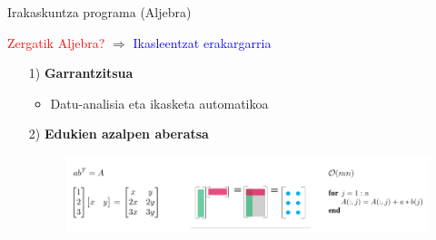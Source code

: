 \documentclass[
 10pt,%
 compress,%
 t,       %
 xcolor=svgnames
]{beamer}
\theoremstyle{definition} \newtheorem{definicion}{Definicion}[section]
\theoremstyle{propiedades} \newtheorem{propiedades}{Propiedades}[section]
\begin{document}
\begin{frame}{Irakaskuntza programa (Aljebra)} 
	
	
	\hspace*{1.cm} \textcolor{red}{Zergatik Aljebra?} \hspace*{1.2cm} $\boldsymbol{\Rightarrow}$ \hspace*{1.2cm} \textcolor{blue}{Ikasleentzat erakargarria}
	
	\bigskip
	\small
	
	\begin{itemize}
		\item[1)] \textbf{Garrantzitsua} %
		\medskip
		\begin{itemize}
			\item Datu-analisia eta ikasketa automatikoa
		\end{itemize}
		
		\bigskip
		
		\item[2)] \textbf{Edukien azalpen aberatsa} %

%		
		\begin{figure}
			\centering
			\begin{minipage}{.9\textwidth}
				\colorbox{white}  {\includegraphics[width=0.9\linewidth]{Definizio bisualak3}}
			\end{minipage}
		\end{figure}
	


\end{itemize}
\end{frame}
\end{document}
